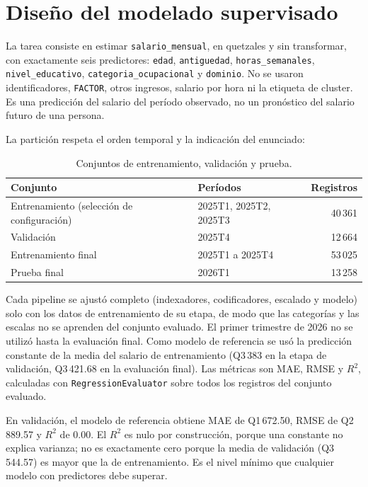 \documentclass[11pt,a4paper]{article}
\newcommand{\var}[1]{\texttt{#1}}
\begin{document}
\section{Diseño del modelado supervisado}

La tarea consiste en estimar \var{salario\_mensual}, en quetzales y sin transformar, con exactamente seis predictores: \var{edad}, \var{antiguedad}, \var{horas\_semanales}, \var{nivel\_educativo}, \var{categoria\_ocupacional} y \var{dominio}. No se usaron identificadores, \var{FACTOR}, otros ingresos, salario por hora ni la etiqueta de cluster. Es una predicción del salario del período observado, no un pronóstico del salario futuro de una persona.

La partición respeta el orden temporal y la indicación del enunciado:

\begin{table}[H]
\centering
\caption{Conjuntos de entrenamiento, validación y prueba.}
\label{tab:particion}
\small
\begin{tabular}{llr}
\toprule
Conjunto & Períodos & Registros \\
\midrule
Entrenamiento (selección de configuración) & 2025T1, 2025T2, 2025T3 & 40\,361 \\
Validación & 2025T4 & 12\,664 \\
Entrenamiento final & 2025T1 a 2025T4 & 53\,025 \\
Prueba final & 2026T1 & 13\,258 \\
\bottomrule
\end{tabular}
\end{table}

Cada pipeline se ajustó completo (indexadores, codificadores, escalado y modelo) solo con los datos de entrenamiento de su etapa, de modo que las categorías y las escalas no se aprenden del conjunto evaluado. El primer trimestre de 2026 no se utilizó hasta la evaluación final. Como modelo de referencia se usó la predicción constante de la media del salario de entrenamiento (Q3\,383 en la etapa de validación, Q3\,421.68 en la evaluación final). Las métricas son MAE, RMSE y $R^2$, calculadas con \var{RegressionEvaluator} sobre todos los registros del conjunto evaluado.

En validación, el modelo de referencia obtiene MAE de Q1\,672.50, RMSE de Q2\,889.57 y $R^2$ de 0.00. El $R^2$ es nulo por construcción, porque una constante no explica varianza; no es exactamente cero porque la media de validación (Q3\,544.57) es mayor que la de entrenamiento. Es el nivel mínimo que cualquier modelo con predictores debe superar.
\end{document}
